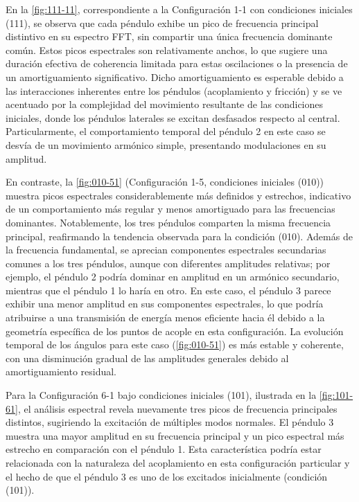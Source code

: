 En la \cref{fig:111-11}, correspondiente a la Configuraci\'on 1-1 con
condiciones iniciales (111), se observa que cada p\'endulo exhibe un
pico de frecuencia principal distintivo en su espectro FFT, sin
compartir una \'unica frecuencia dominante com\'un. Estos picos
espectrales son relativamente anchos, lo que sugiere una duraci\'on
efectiva de coherencia limitada para estas oscilaciones o la
presencia de un amortiguamiento significativo. Dicho amortiguamiento
es esperable debido a las interacciones inherentes entre los
p\'endulos (acoplamiento y fricci\'on) y se ve acentuado por la
complejidad del movimiento resultante de las condiciones iniciales,
donde los p\'endulos laterales se excitan desfasados respecto al
central. Particularmente, el comportamiento temporal del p\'endulo 2
en este caso se desv\'ia de un movimiento arm\'onico
simple, presentando modulaciones en su amplitud.

En contraste, la \cref{fig:010-51} (Configuraci\'on 1-5, condiciones
iniciales (010)) muestra picos espectrales considerablemente m\'as
definidos y estrechos, indicativo de un comportamiento m\'as regular
y menos amortiguado para las frecuencias dominantes. Notablemente,
los tres p\'endulos comparten la misma frecuencia principal,
reafirmando la tendencia observada para la condici\'on (010). Adem\'as
de la frecuencia fundamental, se aprecian componentes espectrales
secundarias comunes a los tres p\'endulos, aunque con diferentes
amplitudes relativas; por ejemplo, el p\'endulo 2 podr\'ia dominar en
amplitud en un arm\'onico secundario, mientras que el p\'endulo 1 lo
har\'ia en otro. En este caso, el p\'endulo 3 parece exhibir una
menor amplitud en sus componentes espectrales, lo que podr\'ia
atribuirse a una transmisi\'on de energ\'ia menos eficiente hacia \'el
debido a la geometr\'ia espec\'ifica de los puntos de acople en esta
configuraci\'on. La evoluci\'on temporal de los \'angulos para este
caso (\cref{fig:010-51}) es m\'as estable y coherente, con una
disminuci\'on gradual de las amplitudes generales debido al
amortiguamiento residual.

Para la Configuraci\'on 6-1 bajo condiciones iniciales (101),
ilustrada en la \cref{fig:101-61}, el an\'alisis espectral revela
nuevamente tres picos de frecuencia principales distintos, sugiriendo
la excitaci\'on de m\'ultiples modos normales. El p\'endulo 3 muestra
una mayor amplitud en su frecuencia principal y un pico espectral
m\'as estrecho en comparaci\'on con el p\'endulo 1. Esta
caracter\'istica podr\'ia estar relacionada con la naturaleza del
acoplamiento en esta configuraci\'on particular y el hecho de que el
p\'endulo 3 es uno de los excitados inicialmente (condici\'on (101)).

